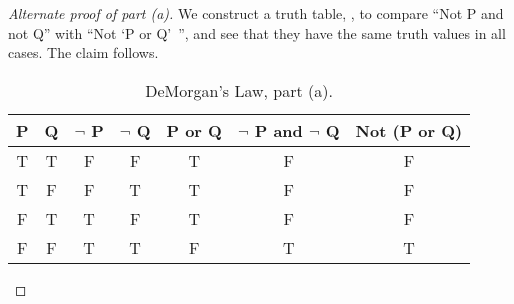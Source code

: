 \documentclass{tufte-book}
\begin{document}
\begin{proof}[Alternate proof of part (a)]
  We construct a truth table, , to compare ``Not P and not Q'' with ``Not `P or Q'~'', and see that they have the same truth values in all cases. The claim follows.
  \begin{table}
    \centering
    \begin{tabular}{ccccccc}
      \toprule
      P & Q & $\neg$ P & $\neg$ Q & P or Q & $\neg$ P and $\neg$ Q & Not (P or Q) \\ \midrule 
      T & T & F & F & T & F & F\\
      T & F & F & T & T & F & F\\
      F & T & T & F & T & F & F\\
      F & F & T & T & F & T & T\\
      \bottomrule
    \end{tabular}
    \caption{DeMorgan's Law, part (a).}
    \label{tab:demorgan-a}
  \end{table}  
\end{proof}




\end{document}
